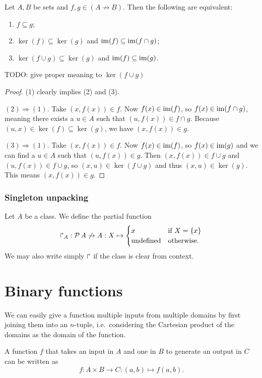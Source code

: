 \begin{proposition} \label{partialFunctionSubset}
Let $A,B$ be sets and $f,g\in(A\not\to B)$. Then the following are equivalent:
\begin{enumerate}
\item $f\subseteq g$;
\item $\ker(f) \subseteq \ker(g)$ and $\operatorname{im}(f)\subseteq \operatorname{im}(f\cap g)$;
\item $\ker(f\cup g) \subseteq \ker(g)$ and $\operatorname{im}(f)\subseteq \operatorname{im}(g)$.
\end{enumerate}
TODO: give proper meaning to $\ker(f\cup g)$
\end{proposition}
\begin{proof}
(1) clearly implies (2) and (3).

$(2) \Rightarrow (1)$. Take $(x,f(x)) \in f$. Now $f(x)\in \operatorname{im}(f)$, so $f(x)\in\operatorname{im}(f\cap g)$, meaning there exists a $u\in A$ such that $(u,f(x))\in f\cap g$. Because $(u,x)\in \ker(f)\subseteq \ker(g)$, we have $(x,f(x))\in g$.

$(3) \Rightarrow (1)$. Take $(x,f(x)) \in f$. Now $f(x)\in \operatorname{im}(f)$, so $f(x)\in\operatorname{im}(g)$ and we can find a $u\in A$ such that $(u,f(x))\in g$. Then $(x,f(x)) \in f\cup g$ and $(u,f(x))\in f\cup g$, so $(x,u)\in \ker(f\cup g)$ and thus $(x,u)\in\ker(g)$. This means $(x,f(x))\in g$.
\end{proof}

\subsubsection{Singleton unpacking}
\begin{definition}
Let $A$ be a class. We define the partial function
\[ \operatorname{\Rsh}_A: \operatorname{\mathcal{P}}{A} \not\to A: X \mapsto \begin{cases}
x & \text{if $X = \{x\}$} \\
\text{undefined} & \text{otherwise}.
\end{cases} \]
We may also write simply $\operatorname{\Rsh}$ if the class is clear from context.
\end{definition}

\section{Binary functions}
We can easily give a function multiple inputs from multiple domains by first joining them into an $n$-tuple, i.e.\ considering the Cartesian product of the domains as the domain of the function.

\begin{example}
A function $f$ that takes an input in $A$ and one in $B$ to generate an output in $C$ can be written as
\[ f: A\times B \to C: (a,b)\mapsto f(a,b). \]
\end{example}


